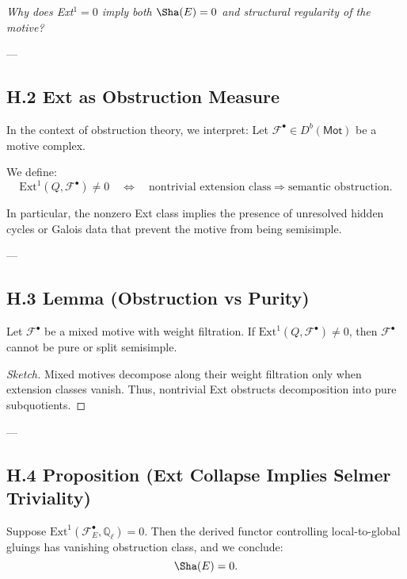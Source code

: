 \begin{center}
\textit{Why does Ext$^1 = 0$ imply both $\Sha(E) = 0$ and structural regularity of the motive?}
\end{center}

---

\subsection*{H.2 Ext as Obstruction Measure}

In the context of obstruction theory, we interpret:
Let \( \mathcal{F}^\bullet \in D^b(\mathsf{Mot}) \) be a motive complex.

\begin{definition}
We define:
\[
\mathrm{Ext}^1(Q, \mathcal{F}^\bullet) \neq 0 \quad \Leftrightarrow \quad 
\text{nontrivial extension class} \Rightarrow \text{semantic obstruction}.
\]
\end{definition}

In particular, the nonzero Ext class implies the presence of unresolved hidden cycles or Galois data  
that prevent the motive from being semisimple.

---

\subsection*{H.3 Lemma (Obstruction vs Purity)}

\begin{lemma}
Let \( \mathcal{F}^\bullet \) be a mixed motive with weight filtration.  
If \( \mathrm{Ext}^1(Q, \mathcal{F}^\bullet) \neq 0 \), then \( \mathcal{F}^\bullet \) cannot be pure or split semisimple.
\end{lemma}

\begin{proof}[Sketch]
Mixed motives decompose along their weight filtration only when extension classes vanish.  
Thus, nontrivial Ext obstructs decomposition into pure subquotients.
\end{proof}

---

\subsection*{H.4 Proposition (Ext Collapse Implies Selmer Triviality)}

\begin{proposition}
Suppose \( \mathrm{Ext}^1(\mathcal{F}_E^\bullet, \mathbb{Q}_\ell) = 0 \).  
Then the derived functor controlling local-to-global gluings has vanishing obstruction class, and we conclude:
\[
\Sha(E) = 0.
\]
\end{proposition}

